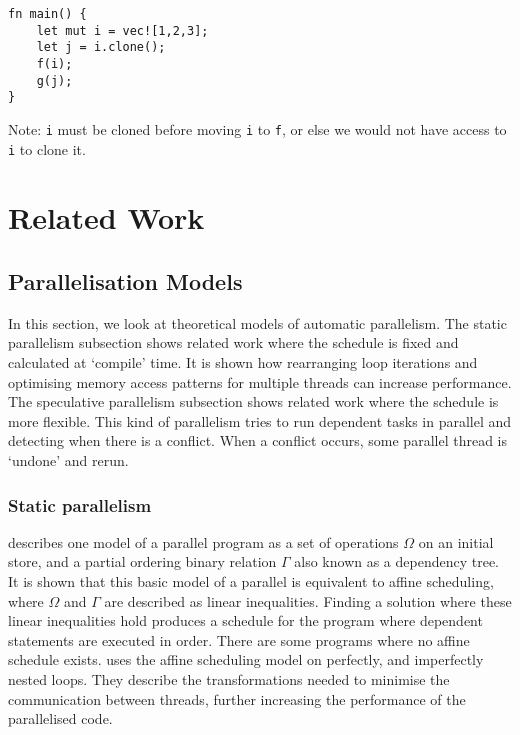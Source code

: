 \documentclass[conference]{IEEEtran}
\begin{document}
\begin{verbatim}
fn main() {
    let mut i = vec![1,2,3];
    let j = i.clone();
    f(i);
    g(j);
}
\end{verbatim}

Note: \texttt{i} must be cloned before moving \texttt{i} to \texttt{f}, or else we would not have access to \texttt{i} to clone it.

\section{Related Work}
\label{sec:related-work}

\subsection{Parallelisation Models}
\label{sec:related-models}
In this section, we look at theoretical models of automatic parallelism. The static parallelism subsection shows related work where the schedule is fixed and calculated at `compile' time. It is shown how rearranging loop iterations and optimising memory access patterns for multiple threads can increase performance. The speculative parallelism subsection shows related work where the schedule is more flexible. This kind of parallelism tries to run dependent tasks in parallel and detecting when there is a conflict. When a conflict occurs, some parallel thread is `undone' and rerun.

\subsubsection{Static parallelism}
\textcite{Feautrier1992,Feautrier1992a} describes one model of a parallel program as a set of operations $\Omega$ on an initial store, and a partial ordering binary relation $\Gamma$ also known as a dependency tree. It is shown that this basic model of a parallel is equivalent to affine scheduling, where $\Omega$ and $\Gamma$ are described as linear inequalities. Finding a solution where these linear inequalities hold produces a schedule for the program where dependent statements are executed in order. There are some programs where no affine schedule exists.
\textcite{Bondhugula2008} uses the affine scheduling model on perfectly, and imperfectly nested loops. They describe the transformations needed to minimise the communication between threads, further increasing the performance of the parallelised code.
\end{document}
